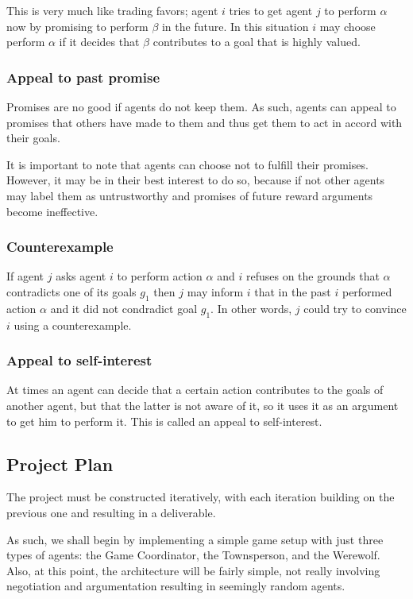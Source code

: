\documentclass{article}
\begin{document}
This is very much like trading favors; agent $i$ tries to get agent $j$ to perform $\alpha$ now by promising to perform $\beta$ in the future. In this situation $i$ may choose perform $\alpha$ if it decides that $\beta$ contributes to a goal that is highly valued.

\subsubsection{Appeal to past promise}
Promises are no good if agents do not keep them. As such, agents can appeal to promises that others have made to them and thus get them to act in accord with their goals.

It is important to note that agents can choose not to fulfill their promises. However, it may be in their best interest to do so, because if not other agents may label them as untrustworthy and promises of future reward arguments become ineffective.

\subsubsection{Counterexample}
If agent $j$ asks agent $i$ to perform action $\alpha$ and $i$ refuses on the grounds that $\alpha$ contradicts one of its goals $g_1$ then $j$ may inform $i$ that in the past $i$  performed action $\alpha$ and it did not condradict goal $g_1$. In other words, $j$ could try to convince $i$ using a counterexample.

\subsubsection{Appeal to self-interest}
At times an agent can decide that a certain action contributes to the goals of another agent, but that the latter is not aware of it, so it uses it as an argument to get him to perform it. This is called an appeal to self-interest.

\subsection{Project Plan}

The project must be constructed iteratively, with each iteration building on the previous one and resulting in a deliverable.

As such, we shall begin by implementing a simple game setup with just three types of agents: the Game Coordinator, the Townsperson, and the Werewolf. Also, at this point, the architecture will be fairly simple, not really involving negotiation and argumentation resulting in seemingly random agents.
\end{document}

